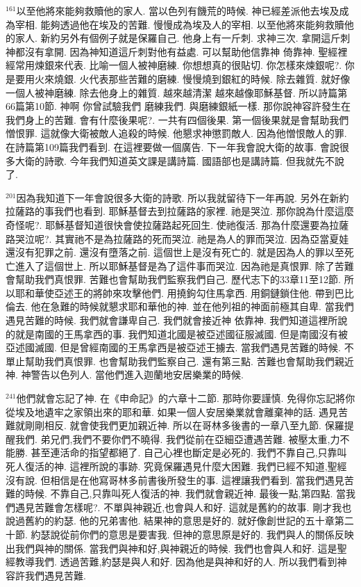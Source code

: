 \documentclass{book}
\begin{document}
$^{161}$以至他將來能夠救贖他的家人.
當以色列有饑荒的時候.
神已經差派他去埃及成為宰相.
能夠透過他在埃及的苦難.
慢慢成為埃及人的宰相.
以至他將來能夠救贖他的家人.
新約另外有個例子就是保羅自己.
他身上有一斤刺.
求神三次.
拿開這斤刺神都沒有拿開.
因為神知道這斤刺對他有益處.
可以幫助他信靠神 倚靠神.
聖經裡經常用煉銀來代表.
比喻一個人被神磨練.
你想想真的很貼切.
你怎樣來煉銀呢?.
你是要用火來燒銀.
火代表那些苦難的磨練.
慢慢燒到銀紅的時候.
除去雜質.
就好像一個人被神磨練.
除去他身上的雜質.
越來越清潔 越來越像耶穌基督.
所以詩篇第66篇第10節.
神啊 你曾試驗我們 磨練我們.
與磨練銀紙一樣.
那你說神容許發生在我們身上的苦難.
會有什麼後果呢?.
一共有四個後果.
第一個後果就是會幫助我們憎恨罪.
這就像大衛被敵人追殺的時候.
他懇求神懲罰敵人.
因為他憎恨敵人的罪.
在詩篇第109篇我們看到.
在這裡要做一個廣告.
下一年我會說大衛的故事.
會說很多大衛的詩歌.
今年我們知道英文課是講詩篇.
國語部也是講詩篇.
但我就先不說了.

$^{201}$因為我知道下一年會說很多大衛的詩歌.
所以我就留待下一年再說.
另外在新約拉薩路的事我們也看到.
耶穌基督去到拉薩路的家裡.
祂是哭泣.
那你說為什麼這麼奇怪呢?.
耶穌基督知道很快會使拉薩路起死回生.
使祂復活.
那為什麼還要為拉薩路哭泣呢?.
其實祂不是為拉薩路的死而哭泣.
祂是為人的罪而哭泣.
因為亞當夏娃還沒有犯罪之前.
還沒有墮落之前.
這個世上是沒有死亡的.
就是因為人的罪以至死亡進入了這個世上.
所以耶穌基督是為了這件事而哭泣.
因為祂是真恨罪.
除了苦難會幫助我們真恨罪.
苦難也會幫助我們監察我們自己.
歷代志下的33章11至12節.
所以耶和華使亞述王的將帥來攻擊他們.
用撓鉤勾住馬拿西.
用銅鏈鎖住他.
帶到巴比倫去.
他在急難的時候就懇求耶和華他的神.
並在他列祖的神面前極其自卑.
當我們遇見苦難的時候.
我們就會謙卑自己.
我們就會接近神 依靠神.
我們知道這裡所說的就是南國的王馬拿西的事.
我們知道北國是被亞述國征服滅國.
但是南國沒有被亞述國滅國.
但是曾經南國的王馬拿西是被亞述王擄去.
當我們遇見苦難的時候.
不單止幫助我們真恨罪.
也會幫助我們監察自己.
還有第三點.
苦難也會幫助我們親近神.
神警告以色列人.
當他們進入迦蘭地安居樂業的時候.

$^{241}$他們就會忘記了神.
在《申命記》的六章十二節.
那時你要謹慎.
免得你忘記將你從埃及地遺牢之家領出來的耶和華.
如果一個人安居樂業就會離棄神的話.
遇見苦難就剛剛相反.
就會使我們更加親近神.
所以在哥林多後書的一章八至九節.
保羅提醒我們.
弟兄們,我們不要你們不曉得.
我們從前在亞細亞遭遇苦難.
被壓太重,力不能勝.
甚至連活命的指望都絕了.
自己心裡也斷定是必死的.
我們不靠自己,只靠叫死人復活的神.
這裡所說的事跡.
究竟保羅遇見什麼大困難.
我們已經不知道,聖經沒有說.
但相信是在他寫哥林多前書後所發生的事.
這裡讓我們看到.
當我們遇見苦難的時候.
不靠自己,只靠叫死人復活的神.
我們就會親近神.
最後一點,第四點.
當我們遇見苦難會怎樣呢?.
不單與神親近,也會與人和好.
這就是舊約的故事.
剛才我也說過舊約的約瑟.
他的兄弟害他.
結果神的意思是好的.
就好像創世記的五十章第二十節.
約瑟說從前你們的意思是要害我.
但神的意思原是好的.
我們與人的關係反映出我們與神的關係.
當我們與神和好,與神親近的時候.
我們也會與人和好.
這是聖經教導我們.
透過苦難,約瑟是與人和好.
因為他是與神和好的人.
所以我們看到神容許我們遇見苦難.
\end{document}
